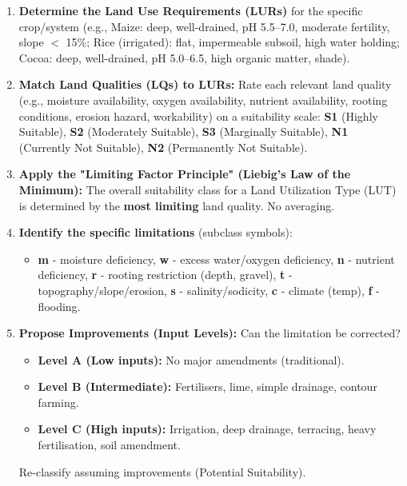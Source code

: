 \documentclass[11pt]{article}
\begin{document}
\begin{methode}
\begin{enumerate}
\item \textbf{Determine the Land Use Requirements (LURs)} for the specific crop/system (e.g., Maize: deep, well-drained, pH 5.5--7.0, moderate fertility, slope $<$ 15\%; Rice (irrigated): flat, impermeable subsoil, high water holding; Cocoa: deep, well-drained, pH 5.0--6.5, high organic matter, shade).
\item \textbf{Match Land Qualities (LQs) to LURs:} Rate each relevant land quality (e.g., moisture availability, oxygen availability, nutrient availability, rooting conditions, erosion hazard, workability) on a suitability scale: \textbf{S1} (Highly Suitable), \textbf{S2} (Moderately Suitable), \textbf{S3} (Marginally Suitable), \textbf{N1} (Currently Not Suitable), \textbf{N2} (Permanently Not Suitable).
\item \textbf{Apply the "Limiting Factor Principle" (Liebig's Law of the Minimum):} The overall suitability class for a Land Utilization Type (LUT) is determined by the \textbf{most limiting} land quality. No averaging.
\item \textbf{Identify the specific limitations} (subclass symbols): 
      \begin{itemize}
      \item \textbf{m} - moisture deficiency, \textbf{w} - excess water/oxygen deficiency, \textbf{n} - nutrient deficiency, \textbf{r} - rooting restriction (depth, gravel), \textbf{t} - topography/slope/erosion, \textbf{s} - salinity/sodicity, \textbf{c} - climate (temp), \textbf{f} - flooding.
      \end{itemize}
\item \textbf{Propose Improvements (Input Levels):} Can the limitation be corrected? 
      \begin{itemize}
      \item \textbf{Level A (Low inputs):} No major amendments (traditional).
      \item \textbf{Level B (Intermediate):} Fertilisers, lime, simple drainage, contour farming.
      \item \textbf{Level C (High inputs):} Irrigation, deep drainage, terracing, heavy fertilisation, soil amendment.
      \end{itemize}
      Re-classify assuming improvements (Potential Suitability).
\end{enumerate}
\end{methode}
\end{document}

